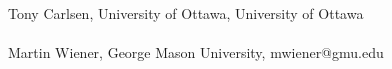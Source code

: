 \documentclass[12pt]{article}
\begin{document}
\\
Tony Carlsen, University of Ottawa, University of Ottawa
\\
\\
Martin Wiener, George Mason University, mwiener@gmu.edu
\end{document}
